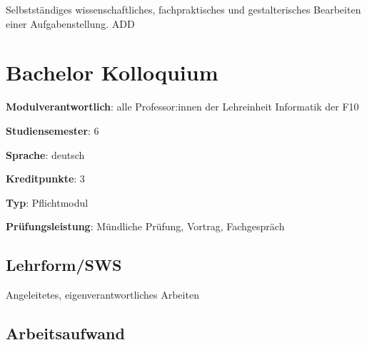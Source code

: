 Selbstständiges wissenschaftliches, fachpraktisches und gestalterisches
Bearbeiten einer Aufgabenstellung. ADD

\hypertarget{bachelor-kolloquiumpathlabelmi-2017modulbeschreibungen-bachelorba_bachelorkolloquium}{%
\chapter{Bachelor
Kolloquium\label{/mi-2017/modulbeschreibungen-bachelor/BA_Bachelorkolloquium}}\label{bachelor-kolloquiumpathlabelmi-2017modulbeschreibungen-bachelorba_bachelorkolloquium}}

\begin{modulHead}
\textbf{Modulverantwortlich}: alle Professor:innen
der Lehreinheit Informatik der
F10
\end{modulHead}
\begin{modulHead}
\textbf{Studiensemester}:
6
\end{modulHead}
\begin{modulHead}
\textbf{Sprache}:
deutsch
\end{modulHead}
\begin{modulHead}
\textbf{Kreditpunkte}:
3
\end{modulHead}
\begin{modulHead}
\textbf{Typ}:
Pflichtmodul
\end{modulHead}
\begin{modulHead}
\textbf{Prüfungsleistung}:
Mündliche Prüfung, Vortrag, Fachgespräch
\end{modulHead}


\hypertarget{lehrformswspathlabelmi-2017modulbeschreibungen-bachelorba_bachelorkolloquium}{%
\section*{Lehrform/SWS\label{/mi-2017/modulbeschreibungen-bachelor/BA_Bachelorkolloquium}}\label{lehrformswspathlabelmi-2017modulbeschreibungen-bachelorba_bachelorkolloquium}}

Angeleitetes, eigenverantwortliches Arbeiten

\hypertarget{arbeitsaufwandpathlabelmi-2017modulbeschreibungen-bachelorba_bachelorkolloquium}{%
\section*{Arbeitsaufwand\label{/mi-2017/modulbeschreibungen-bachelor/BA_Bachelorkolloquium}}\label{arbeitsaufwandpathlabelmi-2017modulbeschreibungen-bachelorba_bachelorkolloquium}}

